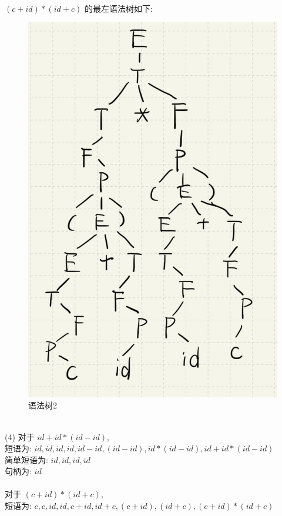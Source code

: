 \documentclass{article}
\begin{document}
\\
$(c + id) * (id + c)$ 的最左语法树如下: \\
\begin{figure}[htbp]
    \centering
    \includegraphics[scale=0.1]{tree2.jpg}
    \caption{语法树2}
\end{figure}
\\
(4)
对于 $id + id * (id - id)$, \\
短语为: $id, id, id, id, id - id, (id - id), id * (id - id), id + id * (id - id)$ \\
简单短语为: $id, id, id, id$ \\
句柄为: $id$ \\
\\
对于 $(c + id) * (id + c)$, \\
短语为: $c, c, id, id, c + id, id + c, (c + id), (id + c), (c + id) * (id + c)$ \\
\end{document}
